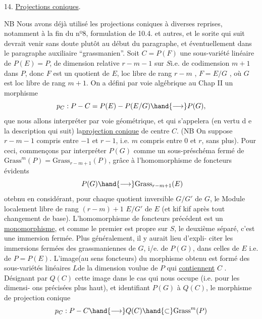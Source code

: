 
14. \uline{Projections coniques}.

NB Nous avons déjà utilisé les projections coniques à diverses
\placedmargin{$\|$}reprises, notamment à la fin du nº8, formulation de 10.4. et autres, et
le sorite qui suit devrait venir sans doute plutôt au début du paragraphe,
et éventuellement dans le paragraphe auxiliaire ``grassmanien''.
Soit $C = P(F)$ une sous-variété linéaire de $P(E)=P$, de dimension
relative $r-m-1$  sur $S$i.e. de codimension $m+1$ dans $P$, donc $F$ est un quotient de $E$, loc libre de
rang $r-m$ , $F=E/G$ , où $G$ est loc libre de rang $m+1$. On a défini
par voie algébrique au Chap II un morphisme
\[ p_C : P - C = P(E) - P(E/G) \hand{\longrightarrow} P(G) , \]
que nous allons interpréter par voie géométrique, et qui s'appelera
(en vertu d e la description qui suit) la\uline{projection conique} de centre $C$.
(NB On suppose $r-m-1$ compris entre $-1$ et $r-1$, i.e. $m$ compris entre $0$
et $r$, sans plus). Pour ceci, commençons par interpréter  $P(G)$
comme un sous-préschéma fermé de $\mathrm{Grass}^m(P)= \mathrm{Grass}_{r-m+1}(P)$, grâce à l'homomorphisme
de foncteurs évidents
\[ \ P(G) \hand{\longrightarrow} \mathrm{Grass}_{r-m+1}(E) \]
otebnu en considérant, pour chaque quotient inversible $G/G'$ de $G$, le
Module localement libre de rang $(r-m)+1$ $E/G'$ de $E$ (et kif kif après
tout changement de base). L'homomorphisme de foncteurs précédent est un
\uline{monomorphisme}, et comme le premier est propre sur $S$, le deuxième séparé,
c'est une immersion fermée. Plus généralement, il y aurait lieu d'expli-%
citer les immersions fermées des grassmaniennes de $G$, i/e. de $P(G)$,
dans celles de $E$ i.e. de $P=P(E)$.  L'image(au sens foncteurs) du morphisme obtenu est formé des
sous-variétés linéaires  $L$de la dimension voulue de $P$ qui \uline{contiennent} $C$ . Désignant
par $Q(C)$ cette image dans le cas qui nous occupe (i.e. pour les dimensi-%
ons précisées plus haut), et identifiant $P(G)$ à $Q(C)$, le morphisme
de projection conique
\[ p_C : P - C \hand{\longrightarrow} Q(C) \hand{\subset} \mathrm{Grass}^m(P) \]


